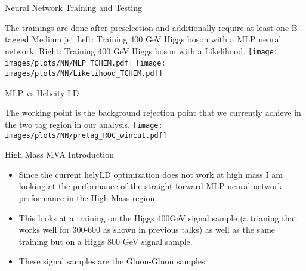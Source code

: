 \begin{frame}{Neural Network Training and Testing}
\begin{center}
The trainings are done after preselection and additionally require at least one B-tagged Medium jet Left: Training 400 GeV Higgs boson with a MLP neural network.  Right: Training 400 GeV Higgs boson with a Likelihood.
\texttt{[image: images/plots/NN/MLP\_TCHEM.pdf]}
\texttt{[image: images/plots/NN/Likelihood\_TCHEM.pdf]}
\end{center}
\end{frame}


\begin{frame}{MLP vs Helicity LD}
\begin{center}
The working point is the background rejection point that we currently achieve in the two tag region in our analysis.
\texttt{[image: images/plots/NN/pretag\_ROC\_wincut.pdf]}
\end{center}
\end{frame}


\begin{frame}{High Mass MVA Introduction}
\begin{itemize}
\item
  Since the current helyLD optimization does not work at high mass I am looking at the performance of the straight forward MLP neural network performance in the High Mass region.
\item
  This looks at a training on the Higgs 400GeV signal sample (a trianing that works well for 300-600 as shown in previous talks) as well as the same training but on a Higgs 800 GeV signal sample.
\item
  These signal samples are the Gluon-Gluon samples
\end{itemize}
\end{frame}


